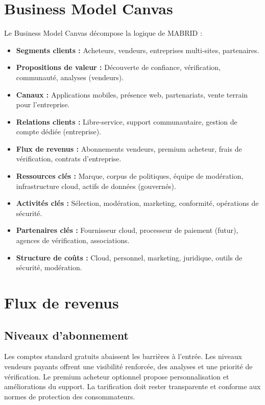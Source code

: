 \section{Business Model Canvas}

Le Business Model Canvas \parencite{osterwalder2010business} décompose la logique de MABRID :

\begin{itemize}
  \item \textbf{Segments clients :} Acheteurs, vendeurs, entreprises multi-sites, partenaires.
  \item \textbf{Propositions de valeur :} Découverte de confiance, vérification, communauté, analyses (vendeurs).
  \item \textbf{Canaux :} Applications mobiles, présence web, partenariats, vente terrain pour l'entreprise.
  \item \textbf{Relations clients :} Libre-service, support communautaire, gestion de compte dédiée (entreprise).
  \item \textbf{Flux de revenus :} Abonnements vendeurs, premium acheteur, frais de vérification, contrats d'entreprise.
  \item \textbf{Ressources clés :} Marque, corpus de politiques, équipe de modération, infrastructure cloud, actifs de données (gouvernés).
  \item \textbf{Activités clés :} Sélection, modération, marketing, conformité, opérations de sécurité.
  \item \textbf{Partenaires clés :} Fournisseur cloud, processeur de paiement (futur), agences de vérification, associations.
  \item \textbf{Structure de coûts :} Cloud, personnel, marketing, juridique, outils de sécurité, modération.
\end{itemize}


\section{Flux de revenus}

\subsection{Niveaux d'abonnement}

Les comptes standard gratuits abaissent les barrières à l'entrée. Les niveaux vendeurs payants offrent une visibilité renforcée, des analyses et une priorité de vérification. Le premium acheteur optionnel propose personnalisation et améliorations du support. La tarification doit rester transparente et conforme aux normes de protection des consommateurs.

